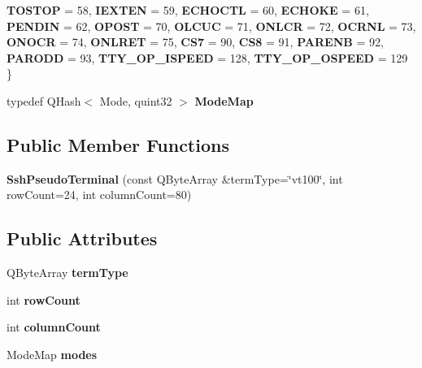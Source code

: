 \begin{DoxyCompactItemize}
{\bfseries T\+O\+S\+T\+OP} = 58, 
{\bfseries I\+E\+X\+T\+EN} = 59, 
\newline
{\bfseries E\+C\+H\+O\+C\+TL} = 60, 
{\bfseries E\+C\+H\+O\+KE} = 61, 
{\bfseries P\+E\+N\+D\+IN} = 62, 
{\bfseries O\+P\+O\+ST} = 70, 
\newline
{\bfseries O\+L\+C\+UC} = 71, 
{\bfseries O\+N\+L\+CR} = 72, 
{\bfseries O\+C\+R\+NL} = 73, 
{\bfseries O\+N\+O\+CR} = 74, 
\newline
{\bfseries O\+N\+L\+R\+ET} = 75, 
{\bfseries C\+S7} = 90, 
{\bfseries C\+S8} = 91, 
{\bfseries P\+A\+R\+E\+NB} = 92, 
\newline
{\bfseries P\+A\+R\+O\+DD} = 93, 
{\bfseries T\+T\+Y\+\_\+\+O\+P\+\_\+\+I\+S\+P\+E\+ED} = 128, 
{\bfseries T\+T\+Y\+\_\+\+O\+P\+\_\+\+O\+S\+P\+E\+ED} = 129
 \}
\item 
\mbox{\label{class_q_ssh_1_1_ssh_pseudo_terminal_af01d09c2b69c61aa253d3f0f55388948}} 
typedef Q\+Hash$<$ Mode, quint32 $>$ {\bfseries Mode\+Map}
\end{DoxyCompactItemize}
\subsection*{Public Member Functions}
\begin{DoxyCompactItemize}
\item 
\mbox{\label{class_q_ssh_1_1_ssh_pseudo_terminal_a61fec0977756ff7608e5aef0f85a9b47}} 
{\bfseries Ssh\+Pseudo\+Terminal} (const Q\+Byte\+Array \&term\+Type=\char`\"{}vt100\char`\"{}, int row\+Count=24, int column\+Count=80)
\end{DoxyCompactItemize}
\subsection*{Public Attributes}
\begin{DoxyCompactItemize}
\item 
\mbox{\label{class_q_ssh_1_1_ssh_pseudo_terminal_a7096f932b2c57588cdb7ab5141ebd919}} 
Q\+Byte\+Array {\bfseries term\+Type}
\item 
\mbox{\label{class_q_ssh_1_1_ssh_pseudo_terminal_a92100e039f0a209fcd5c7734eab7cef3}} 
int {\bfseries row\+Count}
\item 
\mbox{\label{class_q_ssh_1_1_ssh_pseudo_terminal_a0ad635a7f0d3ca31daa5093d99ecd496}} 
int {\bfseries column\+Count}
\item 
\mbox{\label{class_q_ssh_1_1_ssh_pseudo_terminal_a6fec8c8590b488a481ba99b128cfe87d}} 
Mode\+Map {\bfseries modes}
\end{DoxyCompactItemize}


